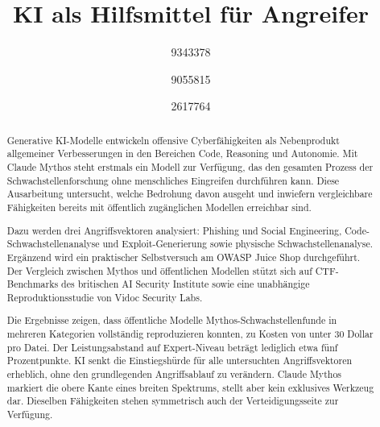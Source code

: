 \documentclass[conference]{IEEEtran}
\begin{document}
\title{KI als Hilfsmittel für Angreifer}

\author{
9343378
\and
{}
9055815
\and
{}
2617764}

\maketitle

\thispagestyle{plain}
\pagestyle{plain}

\begin{abstract}
Generative KI-Modelle entwickeln offensive Cyberfähigkeiten als Nebenprodukt allgemeiner Verbesserungen in den Bereichen Code, Reasoning und Autonomie. Mit Claude Mythos steht erstmals ein Modell zur Verfügung, das den gesamten Prozess der Schwachstellenforschung ohne menschliches Eingreifen durchführen kann. Diese Ausarbeitung untersucht, welche Bedrohung davon ausgeht und inwiefern vergleichbare Fähigkeiten bereits mit öffentlich zugänglichen Modellen erreichbar sind.

Dazu werden drei Angriffsvektoren analysiert: Phishing und Social Engineering, Code-Schwachstellenanalyse und Exploit-Generierung sowie physische Schwachstellenanalyse. Ergänzend wird ein praktischer Selbstversuch am OWASP Juice Shop durchgeführt. Der Vergleich zwischen Mythos und öffentlichen Modellen stützt sich auf CTF-Benchmarks des britischen AI Security Institute sowie eine unabhängige Reproduktionsstudie von Vidoc Security Labs.

Die Ergebnisse zeigen, dass öffentliche Modelle Mythos-Schwachstellenfunde in mehreren Kategorien vollständig reproduzieren konnten, zu Kosten von unter 30 Dollar pro Datei. Der Leistungsabstand auf Expert-Niveau beträgt lediglich etwa fünf Prozentpunkte. KI senkt die Einstiegshürde für alle untersuchten Angriffsvektoren erheblich, ohne den grundlegenden Angriffsablauf zu verändern. Claude Mythos markiert die obere Kante eines breiten Spektrums, stellt aber kein exklusives Werkzeug dar. Dieselben Fähigkeiten stehen symmetrisch auch der Verteidigungsseite zur Verfügung.
\end{abstract}

% 

\IEEEpeerreviewmaketitle











\end{document}

